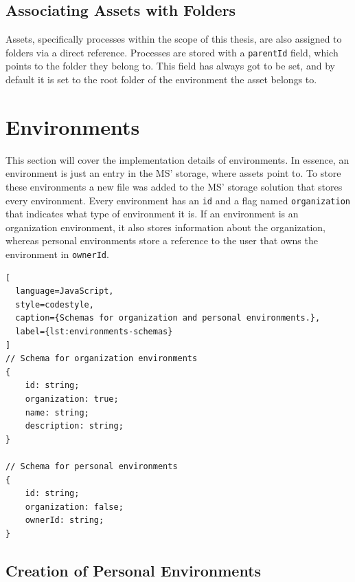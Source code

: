 \subsection{Associating Assets with Folders}

Assets, specifically processes within the scope of this thesis,
are also assigned to folders via a direct reference.
Processes are stored with a \lstinline{parentId} field,
which points to the folder they belong to.
This field has always got to be set, and by default it is set to the root folder of the
environment the asset belongs to.

\section{Environments}


This section will cover the implementation details of environments.
In essence, an environment is just an entry in the MS' storage, where assets point to.
To store these environments a new file was added to the MS' storage solution that stores every environment.
Every environment has an \lstinline{id} and a flag named \lstinline{organization} that
indicates what type of environment it is.
If an environment is an organization environment, it also stores information about the
organization,
whereas personal environments store a reference to the user that owns the environment in
\lstinline{ownerId}.

\begin{lstlisting}[
  language=JavaScript,
  style=codestyle,
  caption={Schemas for organization and personal environments.},
  label={lst:environments-schemas}
]
// Schema for organization environments
{
    id: string;
    organization: true;
    name: string;
    description: string;
}

// Schema for personal environments
{
    id: string;
    organization: false;
    ownerId: string;
}
\end{lstlisting}

\subsection{Creation of Personal Environments}


